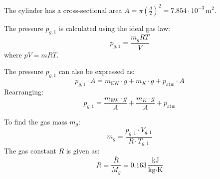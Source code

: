 The cylinder has a cross-sectional area \( A = \pi \left( \frac{d}{2} \right)^2 = 7.854 \cdot 10^{-3} \, \text{m}^2 \).  

The pressure \( p_{g,1} \) is calculated using the ideal gas law:  
\[
p_{g,1} = \frac{m_g R T}{V}
\]  
where \( pV = mRT \).  

The pressure \( p_{g,1} \) can also be expressed as:  
\[
p_{g,1} \cdot A = m_{\text{EW}} \cdot g + m_K \cdot g + p_{\text{atm}} \cdot A
\]  
Rearranging:  
\[
p_{g,1} = \frac{m_{\text{EW}} \cdot g}{A} + \frac{m_K \cdot g}{A} + p_{\text{atm}}
\]  

To find the gas mass \( m_g \):  
\[
m_g = \frac{p_{g,1} \cdot V_{g,1}}{R \cdot T_{g,1}}
\]  
The gas constant \( R \) is given as:  
\[
R = \frac{\bar{R}}{M_g} = 0.163 \, \frac{\text{kJ}}{\text{kg·K}}
\]